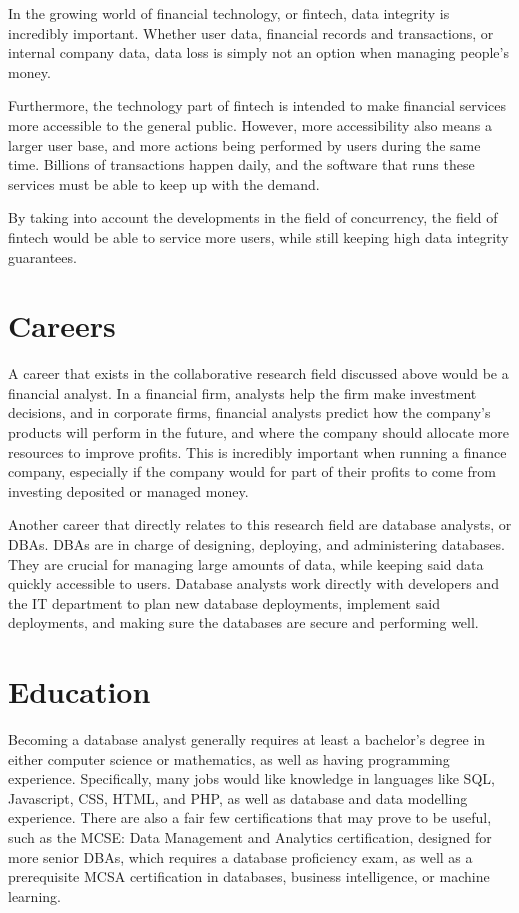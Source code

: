 \documentclass[jou]{apa7}
\begin{document}
In the growing world of financial technology, or fintech,
data integrity is incredibly important.
Whether user data, financial records and transactions, or internal company data,
data loss is simply not an option when managing people's money.

Furthermore, the technology part of fintech is intended to make financial services more accessible to the general public.
However, more accessibility also means a larger user base,
and more actions being performed by users during the same time.
Billions of transactions happen daily,
and the software that runs these services must be able to keep up with the demand.
\autocite{foggSoftwareTestingFintech2020}

By taking into account the developments in the field of concurrency,
the field of fintech would be able to service more users,
while still keeping high data integrity guarantees.

\section{Careers}
A career that exists in the collaborative research field discussed above would be a financial analyst.
In a financial firm, analysts help the firm make investment decisions,
and in corporate firms,
financial analysts predict how the company's products will perform in the future,
and where the company should allocate more resources to improve profits.
This is incredibly important when running a finance company,
especially if the company would for part of their profits to come from investing deposited or managed money.
\autocite{segalBecomingFinancialAnalyst2020}

Another career that directly relates to this research field are database analysts, or DBAs.
DBAs are in charge of designing, deploying, and administering databases.
They are crucial for managing large amounts of data,
while keeping said data quickly accessible to users.
Database analysts work directly with developers and the IT department to plan new database deployments,
implement said deployments,
and making sure the databases are secure and performing well.
\autocite{jobheroDatabaseAnalystJob2020}

\section{Education}
Becoming a database analyst generally requires at least a bachelor's degree in either computer science or mathematics,
as well as having programming experience.
\autocite{governmentofcanadaDatabaseAnalystCanada2020}
Specifically, many jobs would like knowledge in languages like
SQL, Javascript, CSS, HTML, and PHP, as well as database and data modelling experience.
\autocite{jobheroDatabaseAnalystJob2020}
There are also a fair few certifications that may prove to be useful,
such as the MCSE: Data Management and Analytics certification,
designed for more senior DBAs,
which requires a database proficiency exam,
as well as a prerequisite MCSA certification in databases,
business intelligence,
or machine learning.
\autocite{aroraBestDataAnalytics2020}

\printbibliography
\end{document}
